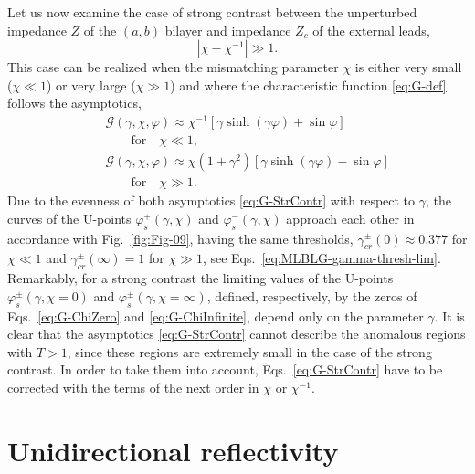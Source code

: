 \documentclass[aps,pra,reprint,showpacs,bibnotes,preprintnumbers,twoside,eqsecnum]{revtex4-1}
\begin{document}
Let us now examine the case of strong contrast between the unperturbed impedance $Z$ of the $(a,b)$ bilayer and impedance $Z_c$ of the external leads,
%
\begin{equation}\label{eq:StrongContrast-def}
|\chi-\chi^{-1}|\gg1.
\end{equation}
This case can be realized when the mismatching parameter $\chi$ is either very small ($\chi\ll1$) or very large ($\chi\gg1$) and where the characteristic function \eqref{eq:G-def} follows the asymptotics,
%
\begin{subequations}\label{eq:G-StrContr}
\begin{eqnarray}
&&\mathcal{G}(\gamma,\chi,\varphi)\approx\chi^{-1}[\gamma\sinh(\gamma\varphi)+\sin\varphi]\nonumber\\
&&\qquad\mathrm{for}\quad\chi\ll1,\label{eq:G-ChiZero}\\[6pt]
&&\mathcal{G}(\gamma,\chi,\varphi)\approx\chi(1+\gamma^2)[\gamma\sinh(\gamma\varphi)-\sin\varphi]\nonumber\\
&&\qquad\mathrm{for}\quad\chi\gg1.\label{eq:G-ChiInfinite}
\end{eqnarray}
\end{subequations}
Due to the evenness of both asymptotics \eqref{eq:G-StrContr} with respect to $\gamma$, the curves of the U-points $\varphi_s^{+}(\gamma,\chi)$ and $\varphi_s^{-}(\gamma,\chi)$ approach each other in accordance with Fig.~\ref{fig:Fig-09}, having the same thresholds, $\gamma_{cr}^{\pm}(0)\approx0.377$ for $\chi\ll1$ and $\gamma_{cr}^{\pm}(\infty)=1$ for $\chi\gg1$, see Eqs.~\eqref{eq:MLBLG-gamma-thresh-lim}. Remarkably, for a strong contrast the limiting values of the U-points $\varphi_s^{\pm}(\gamma,\chi=0)$ and $\varphi_s^{\pm}(\gamma,\chi=\infty)$, defined, respectively, by the zeros of Eqs.~\eqref{eq:G-ChiZero} and \eqref{eq:G-ChiInfinite}, depend only on the parameter $\gamma$. It is clear that the asymptotics \eqref{eq:G-StrContr} cannot describe the anomalous regions with $T>1$, since these regions are extremely small in the case of the strong contrast. In order to take them into account, Eqs.~\eqref{eq:G-StrContr} have to be corrected with the terms of the next order in $\chi$ or $\chi^{-1}$.

\section{Unidirectional reflectivity}
\end{document}
